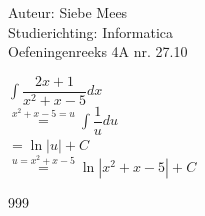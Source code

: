\documentclass[a4paper]{article}
\begin{document}
  
\noindent \large Auteur: Siebe Mees \\
\noindent \large Studierichting: Informatica\\
\noindent \large Oefeningenreeks 4A nr. 27.10\\

\medskip

\normalsize

$\displaystyle\int \dfrac{2x+1}{x^2+x-5} dx $\\

$ \overset{x^2+x-5 = u}{=} \displaystyle\int \dfrac{1}{u} du$\\

$ = \ln |u| + C $\\

$ \overset{u = x^2+x-5}{=} \ln|x^2+x-5| + C $\\

\begin{thebibliography}{999}
\end{thebibliography}
\end{document}
